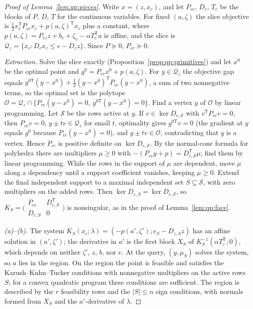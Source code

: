 \begin{proof}[Proof of Lemma~\ref{lem:qp:pieces}]
Write $x=(z,x_c)$, and let $P_{cc}$, $D_c$, $T_c$ be the blocks of $P$, $D$, $T$
for the continuous variables. For fixed $(a,\zeta)$ the slice objective is
$\frac12x_c^{\mathsf T} P_{cc}x_c+p(a,\zeta)^{\mathsf T} x_c$ plus a constant, where
$p(a,\zeta)=P_{cz}z+b_c+\zeta_c-\alpha T_c^{\mathsf T} a$ is affine, and the slice is
$\mathcal Q_z=\{x_c:D_cx_c\le e-D_zz\}$. Since $P\succeq0$, $P_{cc}\succeq0$.

\emph{Extraction.} Solve the slice exactly
(Proposition~\ref{prop:qp:primitives}) and let $x^0$ be the optimal point and
$g^0=P_{cc}x^0+p(a,\zeta)$. For $y\in\mathcal Q_z$ the objective gap equals
$g^{0\mathsf T}(y-x^0)+\frac12(y-x^0)^{\mathsf T} P_{cc}(y-x^0)$, a sum of two nonnegative
terms, so the optimal set is the polytope
$\mathcal O=\mathcal Q_z\cap\{P_{cc}(y-x^0)=0,\ g^{0\mathsf T}(y-x^0)=0\}$. Find a vertex
$y$ of $\mathcal O$ by linear programming. Let $\mathcal S$ be the rows active at
$y$. If $v\in\ker D_{c,\mathcal S}$ with $v^{\mathsf T} P_{cc}v=0$, then $P_{cc}v=0$,
$y\pm tv\in\mathcal Q_z$ for small $t$, optimality gives $g^{0\mathsf T}v=0$ (the
gradient at $y$ equals $g^0$ because $P_{cc}(y-x^0)=0$), and $y\pm tv\in\mathcal O$,
contradicting that $y$ is a vertex. Hence $P_{cc}$ is positive definite on
$\ker D_{c,\mathcal S}$. By the normal-cone formula for polyhedra there are
multipliers $\mu\ge0$ with $-(P_{cc}y+p)=D_{c,\mathcal S}^{\mathsf T}\mu$; find them by
linear programming. While the rows in the support of $\mu$ are dependent, move
$\mu$ along a dependency until a support coefficient vanishes, keeping
$\mu\ge0$. Extend the final independent support to a maximal independent set
$S\subseteq\mathcal S$, with zero multipliers on the added rows. Then
$\ker D_{c,S}=\ker D_{c,\mathcal S}$, so
$K_S=\bigl(\begin{smallmatrix}P_{cc}&D_{c,S}^{\mathsf T}\\D_{c,S}&0\end{smallmatrix}\bigr)$
is nonsingular, as in the proof of Lemma~\ref{lem:qp:face}.

\emph{(a)--(b).} The system $K_S(x_c;\lambda)=(-p(a',\zeta');e_S-D_{z,S}z)$ has
an affine solution in $(a',\zeta')$; the derivative in $a'$ is the first block
$X_S$ of $K_S^{-1}(\alpha T_c^{\mathsf T};0)$, which depends on neither $\zeta'$, $z$,
$b$, nor $e$. At the query, $(y,\mu_S)$ solves the system, so $a$ lies in the
region. On the region the point is feasible and satisfies the
Karush--Kuhn--Tucker conditions with nonnegative multipliers on the active
rows $S$; for a convex quadratic program these conditions are sufficient. The
region is described by the $r$ feasibility rows and the $|S|\le n$ sign
conditions, with normals formed from $X_S$ and the $a'$-derivative of
$\lambda$.


\end{proof}
